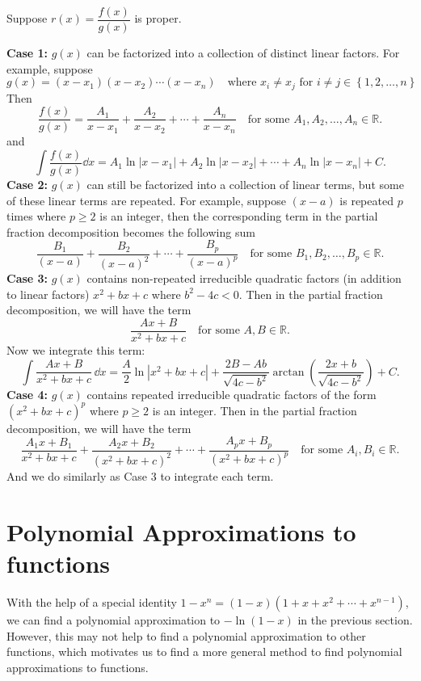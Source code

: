 \documentclass[a4paper]{ctexart}
\begin{document}
    \begin{mymthd}
        Suppose $r(x)=\dfrac{f(x)}{g(x)}$ is proper.

        \textbf{Case 1:}
        $g(x)$ can be factorized into a collection of distinct linear factors. For example, suppose
        \[
        g(x)=(x-x_1)(x-x_2)\cdots (x-x_n) \quad \text{where } x_i \neq x_j \text{ for } i\neq j \in \left\{ 1, 2, \ldots, n \right\}
        \]
        Then
        \[
        \frac{f(x)}{g(x)}=\frac{A_1}{x-x_1} + \frac{A_2}{x-x_2} + \cdots + \frac{A_n}{x-x_n}\quad \text{for some } A_1, A_2, \ldots, A_n \in \mathbb{R}.
        \]
        and
        \[
        \int \frac{f(x)}{g(x)} \dd x = A_1 \ln |x-x_1| + A_2 \ln |x-x_2| + \cdots + A_n \ln |x-x_n| + C.
        \]
        \indent
        \textbf{Case 2:}
        $g(x)$ can still be factorized into a collection of linear terms, but some of these linear terms are repeated. For example, suppose $(x-a)$ is repeated $p$ times where $p\ge 2$ is an integer, then the corresponding term in the partial fraction decomposition becomes the following sum
        \[
        \frac{B_1}{(x-a)} + \frac{B_2}{(x-a)^2} + \cdots + \frac{B_p}{(x-a)^p}\quad \text{for some } B_1, B_2, \ldots, B_p \in \mathbb{R}.
        \]
        \indent
        \textbf{Case 3:}
        $g(x)$ contains non-repeated irreducible quadratic factors (in addition to linear factors) $x^2 + bx + c$ where $b^2 - 4c < 0$. Then in the partial fraction decomposition, we will have the term
        \[
        \frac{Ax+B}{x^2 + bx + c}\quad \text{for some } A,B \in \mathbb{R}.
        \]
        Now we integrate this term:
        \[
        \int \frac{Ax+B}{x^2 + bx + c}\, \dd x = \frac{A}{2} \ln |x^2 + bx + c| + \frac{2B - Ab}{\sqrt{4c - b^2}} \arctan \left( \frac{2x + b}{\sqrt{4c - b^2}} \right) + C.
        \]
        \indent
        \textbf{Case 4:}
        $g(x)$ contains repeated irreducible quadratic factors of the form $(x^2 + bx + c)^p$ where $p\ge 2$ is an integer. Then in the partial fraction decomposition, we will have the term
        \[
        \frac{A_1 x + B_1}{x^2 + bx + c} + \frac{A_2 x + B_2}{(x^2 + bx + c)^2} + \cdots + \frac{A_p x + B_p}{(x^2 + bx + c)^p}\quad \text{for some } A_i, B_i \in \mathbb{R}.
        \]
        And we do similarly as Case 3 to integrate each term.
    \end{mymthd}

    \newpage
    \section{Polynomial Approximations to functions}
    With the help of a special identity $1-x^n = (1-x)(1+x+x^2+\cdots + x^{n-1})$, we can find a polynomial approximation to $-\ln(1-x)$ in the previous section. However, this may not help to find a polynomial approximation to other functions, which motivates us to find a more general method to find polynomial approximations to functions.
\end{document}
